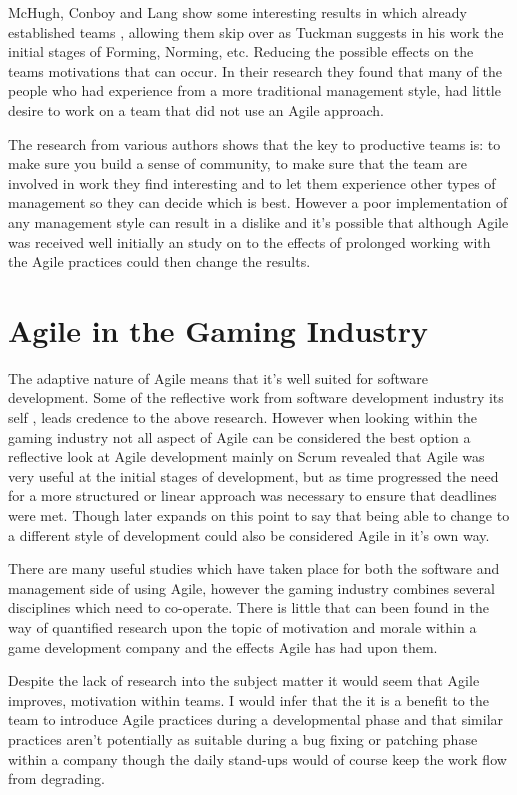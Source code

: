 \documentclass{scrartcl}
\begin{document}
McHugh, Conboy and Lang \cite {AgilePractices} show some interesting results in which already established teams , allowing them skip over as Tuckman \cite {Tuckman} suggests in his work the initial stages of Forming, Norming, etc. Reducing the possible effects on the teams motivations that can occur. In their research they found that many of the people who had experience from a more traditional management style, had little desire to work on a team that did not use an Agile approach.
 
The research from various authors shows that the key to productive teams is: to make sure you build a sense of community, to make sure that the team are involved in work they find interesting and to let them experience other types of management so they can decide which is best. However a poor implementation of any management style can result in a dislike and it's possible that although Agile was received well initially an study on to the effects of prolonged working with the Agile practices could then change the results.

\section{Agile in the Gaming Industry}

The adaptive nature of Agile means that it's well suited for software development. Some of the reflective work from software development industry its self \cite{Practitioners}, leads credence to the above research. However when looking within the gaming industry not all aspect of Agile can be considered the best option \cite{RyseCrisis} a reflective look at Agile development mainly on Scrum revealed that Agile was very useful at the initial stages of development, but as time progressed the need for a more structured or linear approach was necessary to ensure that deadlines were met. Though later expands on this point to say that being able to change to a different style of development could also be considered Agile in it's own way. 

There are many useful studies which have taken place for both the software and management side of using Agile, however the gaming industry combines several disciplines which need to co-operate. There is little that can been found in the way of quantified research upon the topic of motivation and morale within a game development company and the effects Agile has had upon them. 

Despite the lack of research into the subject matter it would seem that Agile improves, motivation within teams. I would infer that the it is a benefit to the team to introduce Agile practices during a developmental phase and that similar practices aren't potentially as suitable during a bug fixing or patching phase within a company though the daily stand-ups would of course keep the work flow from degrading.
\end{document}
